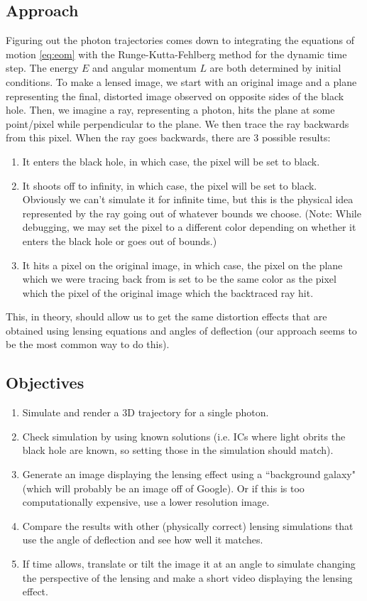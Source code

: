 \documentclass{article}
\begin{document}
\subsection*{Approach}
Figuring out the photon trajectories comes down to integrating the equations of motion \ref{eq:eom} with the Runge-Kutta-Fehlberg method for the dynamic time step. The energy \(E\) and angular momentum \(L\) are both determined by initial conditions. To make a lensed image, we start with an original image and a plane representing the final, distorted image observed on opposite sides of the black hole. Then, we imagine a ray, representing a photon, hits the plane at some point/pixel while perpendicular to the plane. We then trace the ray backwards from this pixel. When the ray goes backwards, there are 3 possible results:
\begin{enumerate}
	\item It enters the black hole, in which case, the pixel will be set to black.
	\item  It shoots off to infinity, in which case, the pixel will be set to black. Obviously we can't simulate it for infinite time, but this is the physical idea represented by the ray going out of whatever bounds we choose.
(Note: While debugging, we may set the pixel to a different color depending on whether it enters the black hole or goes out of bounds.)
	\item It hits a pixel on the original image, in which case, the pixel on the plane which we were tracing back from is set to be the same color as the pixel which the pixel of the original image which the backtraced ray hit.
\end{enumerate}
This, in theory, should allow us to get the same distortion effects that are obtained using lensing equations and angles of deflection (our approach seems to be the most common way to do this). 

\subsection*{Objectives}
\begin{enumerate}
	\item Simulate and render a 3D trajectory for a single photon.
	\item Check simulation by using known solutions (i.e. ICs where light obrits the black hole are known, so setting those in the simulation should match).
	\item Generate an image displaying the lensing effect using a ``background galaxy" (which will probably be an image off of Google). Or if this is too computationally expensive, use a lower resolution image. 
	\item Compare the results with other (physically correct) lensing simulations that use the angle of deflection and see how well it matches.
	\item If time allows, translate or tilt the image it at an angle to simulate changing the perspective of the lensing and make a short video displaying the lensing effect.
\end{enumerate}

	
	
	
	
\end{document}
